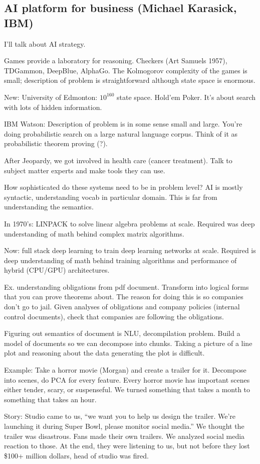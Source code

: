 \subsection{AI platform for business (Michael Karasick, IBM)}

I'll talk about AI strategy.

Games provide a laboratory for reasoning.
Checkers (Art Samuels 1957), TDGammon, DeepBlue, AlphaGo.
The Kolmogorov complexity of the games is small; description of problem is straightforward although state space is enormous. 

New: University of Edmonton: $10^{160}$ state space. Hold'em Poker. It's about search with lots of hidden information.

IBM Watson: Description of problem is in some sense small and large. You're doing probabilistic search on a large natural language corpus. Think of it as probabilistic theorem proving (?). 

After Jeopardy, we got involved in health care (cancer treatment). Talk to subject matter experts and make tools they can use. 

How sophisticated do these systems need to be in problem level? AI is mostly syntactic, understanding vocab in particular domain. This is far from understanding the semantics. 

In 1970's: LINPACK to solve linear algebra problems at scale. Required was deep understanding of math behind complex matrix algorithms.

Now: full stack deep learning to train deep learning networks at scale. Required is deep understanding of math behind training algorithms and performance of hybrid (CPU/GPU) architectures.



Ex. understanding obligations from pdf document. Transform into logical forms that you can prove theorems about. The reason for doing this is so companies don't go to jail. Given analyses of obligations and company policies (internal control documents), check that companies are following the obligations.

Figuring out semantics of document is NLU, decompilation problem. Build a model of documents so we can decompose into chunks. Taking a picture of a line plot and reasoning about the data generating the plot is difficult.

Example: Take a horror movie (Morgan) and create a trailer for it.
Decompose into scenes, do PCA for every feature. Every horror movie has important scenes either tender, scary, or suspenseful. 
We turned something that takes a month to something that takes an hour.

Story: Studio came to us, ``we want you to help us design the trailer. We're launching it during Super Bowl, please monitor social media.'' We thought the trailer was disastrous. Fans made their own trailers. We analyzed social media reaction to those. At the end, they were listening to us, but not before they lost \$100+ million dollars, head of studio was fired.

